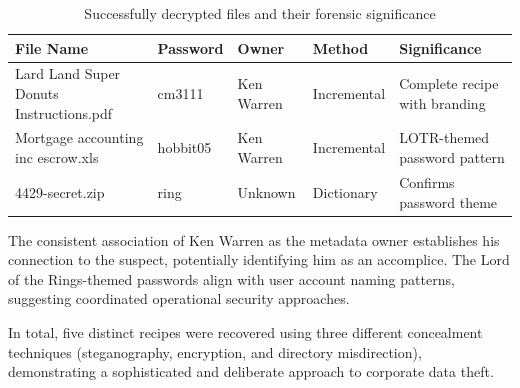 \begin{table}[htbp]
\centering
\small
\begin{tabular}{|p{4cm}|p{1.8cm}|p{2.5cm}|p{2cm}|p{4.5cm}|}
\hline
\textbf{File Name} & \textbf{Password} & \textbf{Owner} & \textbf{Method} & \textbf{Significance} \\
\hline
Lard Land Super Donuts Instructions.pdf & cm3111 & Ken Warren & Incremental & Complete recipe with branding \\
\hline
Mortgage accounting inc escrow.xls & hobbit05 & Ken Warren & Incremental & LOTR-themed password pattern \\
\hline
4429-secret.zip & ring & Unknown & Dictionary & Confirms password theme  \\
\hline
\end{tabular}
\caption{Successfully decrypted files and their forensic significance}
\label{table:decryption_summary}
\end{table}

The consistent association of Ken Warren as the metadata owner establishes his connection to the suspect, potentially identifying him as an accomplice. The Lord of the Rings-themed passwords align with user account naming patterns, suggesting coordinated operational security approaches.

In total, five distinct recipes were recovered using three different concealment techniques (steganography, encryption, and directory misdirection), demonstrating a sophisticated and deliberate approach to corporate data theft.